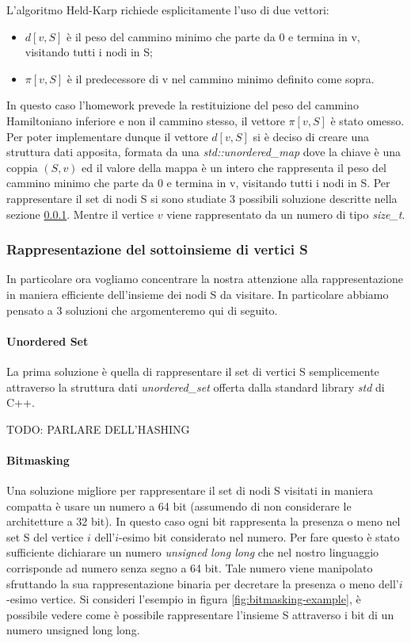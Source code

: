 L'algoritmo Held-Karp richiede esplicitamente l'uso di due vettori:
\begin{itemize}
    \item $d[v,S]$ è il peso del cammino minimo che parte da 0 e termina in v, visitando tutti i nodi in S;
    \item $\pi[v,S]$ è il predecessore di v nel cammino minimo definito come sopra.
\end{itemize}

In questo caso l'homework prevede la restituizione del peso del cammino Hamiltoniano inferiore e non il cammino stesso, il vettore $\pi[v,S]$ è stato omesso. Per poter implementare dunque il vettore $d[v,S]$ si è deciso di creare una struttura dati apposita, formata da una \textit{std::unordered\_map} dove la chiave è una coppia $(S, v)$ ed il valore della mappa è un intero che rappresenta il peso del cammino minimo che parte da 0 e termina in v, visitando tutti i nodi in S. Per rappresentare il set di nodi S si sono studiate 3 possibili soluzione descritte nella sezione \ref{cap:S-repr}. Mentre il vertice $v$ viene rappresentato da un numero di tipo \textit{size\_t}.

\subsubsection{Rappresentazione del sottoinsieme di vertici S}
\label{cap:S-repr}
In particolare ora vogliamo concentrare la nostra attenzione alla rappresentazione in maniera efficiente dell'insieme dei nodi S da visitare. In particolare abbiamo pensato a 3 soluzioni che argomenteremo qui di seguito.

\paragraph{Unordered Set}
La prima soluzione è quella di rappresentare il set di vertici S semplicemente attraverso la struttura dati \textit{unordered\_set} offerta dalla standard library \textit{std} di C++.  

TODO: PARLARE DELL'HASHING

\paragraph{Bitmasking}

\noindent Una soluzione migliore per rappresentare il set di nodi S visitati in maniera compatta è usare un numero a 64 bit (assumendo di non considerare le architetture a 32 bit). In questo caso ogni bit rappresenta la presenza o meno nel set S del vertice $i$ dell'$i$-esimo bit considerato nel numero. Per fare questo è stato sufficiente dichiarare un numero \textit{unsigned long long} che nel nostro linguaggio corrisponde ad numero senza segno a 64 bit. Tale numero viene manipolato sfruttando la sua rappresentazione binaria per decretare la presenza o meno dell'$i$-esimo vertice. Si consideri l'esempio in figura \ref{fig:bitmasking-example}, è possibile vedere come è possibile rappresentare l'insieme S attraverso i bit di un numero unsigned long long. 

